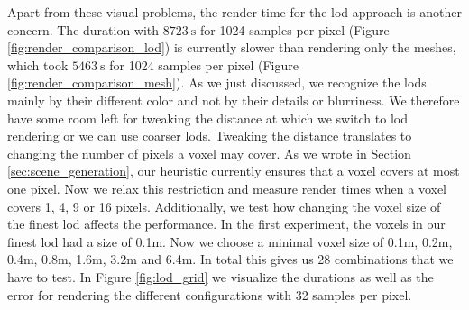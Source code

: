 Apart from these visual problems, the render time for the \ac{lod} approach is another concern.
The duration with $\SI{8723}{\s}$ for 1024 samples per pixel (Figure \ref{fig:render_comparison_lod}) is currently slower than rendering only the meshes, which took $\SI{5463}{\s}$ for 1024 samples per pixel (Figure \ref{fig:render_comparison_mesh}).
As we just discussed, we recognize the \acsp{lod} mainly by their different color and not by their details or blurriness.
We therefore have some room left for tweaking the distance at which we switch to \ac{lod} rendering or we can use coarser \acsp{lod}.
Tweaking the distance translates to changing the number of pixels a voxel may cover.
As we wrote in Section \ref{sec:scene_generation}, our heuristic currently ensures that a voxel covers at most one pixel.
Now we relax this restriction and measure render times when a voxel covers 1, 4, 9 or 16 pixels.
Additionally, we test how changing the voxel size of the finest \ac{lod} affects the performance.
In the first experiment, the voxels in our finest \ac{lod} had a size of 0.1m.
Now we choose a minimal voxel size of 0.1m, 0.2m, 0.4m, 0.8m, 1.6m, 3.2m and 6.4m.
In total this gives us 28 combinations that we have to test.
In Figure \ref{fig:lod_grid} we visualize the durations as well as the \FLIP error for rendering the different configurations with 32 samples per pixel.
